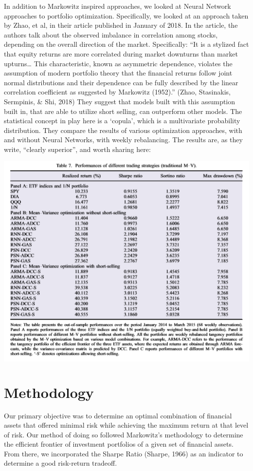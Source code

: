 \documentclass[12pt]{article} %
\begin{document}
In addition to Markowitz inspired approaches, we looked at Neural Network approaches to portfolio optimization. Specifically, we looked at an approach taken by Zhao, et al, in their article published in January of 2018. In the article, the authors talk about the observed imbalance in correlation among stocks, depending on the overall direction of the market. Specifically: ``It is a stylized fact that equity returns are more correlated during market downturns than market upturns… This characteristic, known as asymmetric dependence, violates the assumption of modern portfolio theory that the financial returns follow joint normal distributions and their dependence can be fully described by the linear correlation coefficient as suggested by Markowitz (1952).” (Zhao, Stasinakis, Sermpinis, \& Shi, 2018) They suggest that models built with this assumption built in, that are able to utilize short selling, can outperform other models. The statistical concept in play here is a ‘copula’, which is a multivariate probability distribution. They compare the results of various optimization approaches, with and without Neural Networks, with weekly rebalancing. The results are, as they write, ``clearly superior”, and worth sharing here:

\includegraphics[width=\textwidth]{table1}

 
\section{Methodology}

Our primary objective was to determine an optimal combination of financial assets that offered minimal risk while achieving the maximum return at that level of risk. Our method of doing so followed Markowitz’s methodology to determine the efficient frontier of investment portfolios of a given set of financial assets. From there, we incorporated the Sharpe Ratio (Sharpe, 1966) as an indicator to determine a good risk-return tradeoff.
\end{document}
